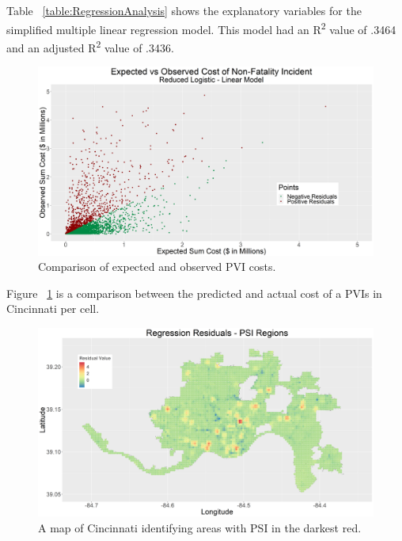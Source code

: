 \documentclass{llncs}
\begin{document}
Table ~\ref{table:RegressionAnalysis} shows the explanatory variables for the simplified multiple linear regression model. This model had an R\textsuperscript{2} value of .3464 and an adjusted R\textsuperscript{2} value of .3436.

\FloatBarrier
\begin{figure}
\includegraphics[width=\textwidth, height=\textheight, keepaspectratio]{000LinearModelReduced.png}
\caption{Comparison of expected and observed PVI costs.}
\label{figure:LinearModelReduced}

\end{figure}
\FloatBarrier

Figure ~\ref{figure:LinearModelReduced} is a comparison between the predicted and actual cost of a PVIs in Cincinnati per cell.

\FloatBarrier
\begin{figure}
\includegraphics[width=\textwidth, height=\textheight, keepaspectratio]{000ResidualsPlot.png}
\caption{A map of Cincinnati identifying areas with PSI in the darkest red.}
\label{figure:ResidualsPlot}

\end{figure}
\FloatBarrier
\end{document}
